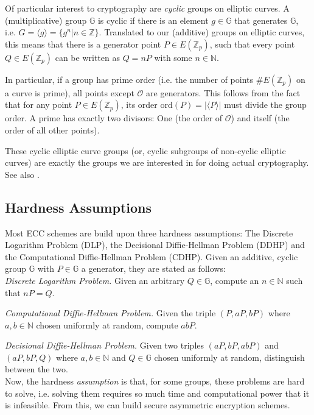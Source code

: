 Of particular interest to cryptography are \emph{cyclic} groups on elliptic curves. 
A (multiplicative) group $\mathbb{G}$ is cyclic if there is an element $g \in \mathbb{G}$ that generates $\mathbb{G}$, i.e. $G = \langle g \rangle = \{g^n | n \in \mathbb{Z}\}$.
Translated to our (additive) groups on elliptic curves, this means that there is a generator point $P \in E(\mathbb{Z}_p)$, such that every point $Q \in E(\mathbb{Z}_p)$ can be written as $Q = nP$ with some $n \in \mathbb{N}$.

In particular, if a group has prime order (i.e. the number of points $\#E(\mathbb{Z}_p)$ on a curve is prime), all points except $\mathcal{O}$ are generators.
This follows from the fact that for any point $P \in E(\mathbb{Z}_p)$, its order $\text{ord}(P) = | \langle P \rangle |$ must divide the group order.
A prime has exactly two divisors: One (the order of $\mathcal{O}$) and itself (the order of all other points).

These cyclic elliptic curve groups (or, cyclic subgroups of non-cyclic elliptic curves) are exactly the groups we are interested in for doing actual cryptography. See also \cite[p.~321]{katz_introduction_2015}.

\subsection{Hardness Assumptions}

Most ECC schemes are build upon three hardness assumptions: The Discrete Logarithm Problem (DLP), the Decisional Diffie-Hellman Problem (DDHP) and the Computational Diffie-Hellman Problem (CDHP).
Given an additive, cyclic group $\mathbb{G}$ with $P \in \mathbb{G}$ a generator, they are stated as follows:
\\

\emph{Discrete Logarithm Problem.} Given an arbitrary $Q \in \mathbb{G}$, compute an $n \in \mathbb{N}$ such that $n P = Q$. %

\emph{Computational Diffie-Hellman Problem.} Given the triple $(P, aP, bP)$ where $a, b \in \mathbb{N}$ chosen uniformly at random, compute $abP$.

\emph{Decisional Diffie-Hellman Problem.} Given two triples $(aP, bP, abP)$ and $(aP, bP, Q)$ where $a, b \in \mathbb{N}$ and $Q \in \mathbb{G}$ chosen uniformly at random, distinguish between the two.
\\

Now, the hardness \emph{assumption} is that, for some groups, these problems are hard to solve, i.e. solving them requires so much time and computational power that it is infeasible.
From this, we can build secure asymmetric encryption schemes.


